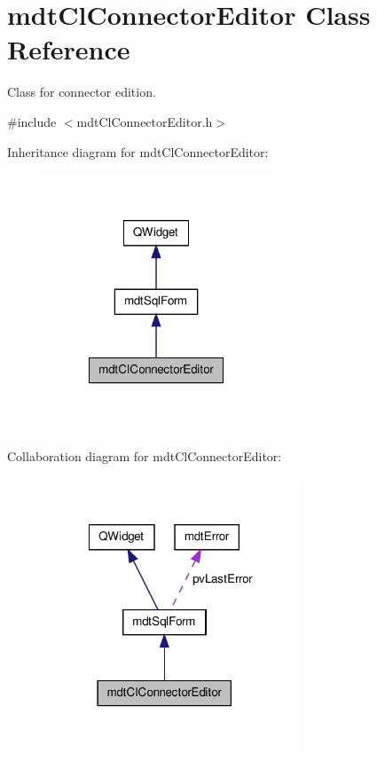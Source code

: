 \hypertarget{classmdt_cl_connector_editor}{\section{mdt\-Cl\-Connector\-Editor Class Reference}
\label{classmdt_cl_connector_editor}
}


Class for connector edition.  




{\ttfamily \#include $<$mdt\-Cl\-Connector\-Editor.\-h$>$}



Inheritance diagram for mdt\-Cl\-Connector\-Editor\-:
\nopagebreak
\begin{figure}[H]
\begin{center}
\leavevmode
\includegraphics[width=192pt]{classmdt_cl_connector_editor__inherit__graph}
\end{center}
\end{figure}


Collaboration diagram for mdt\-Cl\-Connector\-Editor\-:
\nopagebreak
\begin{figure}[H]
\begin{center}
\leavevmode
\includegraphics[width=218pt]{classmdt_cl_connector_editor__coll__graph}
\end{center}
\end{figure}
